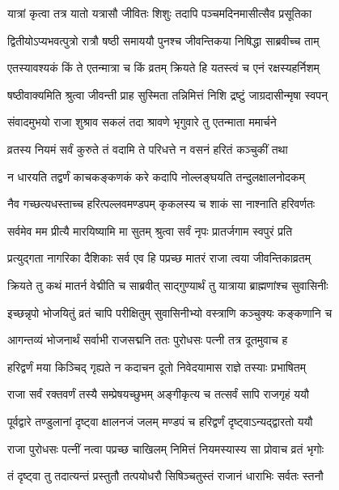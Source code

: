\twolineshloka
{यात्रां कृत्वा तत्र यातो यत्रासौ जीवितः शिशुः}
{तदापि पञ्चमदिनमासीत्सैव प्रसूतिका} %

\twolineshloka
{द्वितीयोऽप्यभवत्पुत्रो रात्रौ षष्ठी समाययौ}
{पुनश्च जीवन्तिकया निषिद्धा साब्रवीच्च ताम्} %

\twolineshloka
{एतस्यावश्यकं किं ते एतन्मात्रा च किं व्रतम्}
{क्रियते हि यतस्त्वं च एनं रक्षस्यहर्निशम्} %

\twolineshloka
{षष्ठीवाक्यमिति श्रुत्वा जीवन्ती प्राह सुस्मिता}
{तन्निमित्तं निशि द्रष्टुं जाग्रदासीन्मृषा स्वपन्} %

\twolineshloka
{संवादमुभयो राजा शुश्राव सकलं तदा}
{श्रावणे भृगुवारे तु एतन्माता ममार्चने} %

\twolineshloka
{व्रतस्य नियमं सर्वं कुरुते तं वदामि ते}
{परिधत्ते न वसनं हरितं कञ्चुकीं तथा} %

\twolineshloka
{न धारयति तद्वर्णं काचकङ्कणकं करे}
{कदापि नोल्लङ्घयति तन्दुलक्षालनोदकम्} %

\twolineshloka
{नैव गच्छत्यधस्ताच्च हरित्पल्लवमण्डपम्}
{कृकलस्य च शाकं सा नाश्नाति हरिवर्णतः} %

\twolineshloka
{सर्वमेव मम प्रीत्यै मारयिष्यामि मा सुतम्}
{श्रुत्वा सर्वं नृपः प्रातर्जगाम स्वपुरं प्रति} %

\twolineshloka
{प्रत्युद्गता नागरिका दैशिकाः सर्व एव हि}
{पप्रच्छ मातरं राजा त्वया जीवन्तिकाव्रतम्} %

\twolineshloka
{क्रियते तु कथं मातर्न वेद्मीति च साब्रवीत्}
{साद्गुण्यार्थं तु यात्राया ब्राह्मणांश्च सुवासिनीः} %

\twolineshloka
{इच्छन्नृपो भोजयितुं व्रतं चापि परीक्षितुम्}
{सुवासिनीभ्यो वस्त्राणि कञ्चुक्यः कङ्कणानि च} %

\twolineshloka
{आगन्तव्यं भोजनार्थं सर्वाभी राजसद्मनि}
{ततः पुरोधसः पत्नी तत्र दूतमुवाच ह} %

\twolineshloka
{हरिद्वर्णं मया किञ्चिद् गृह्यते न कदाचन}
{दूतो निवेदयामास राज्ञे तस्याः प्रभाषितम्} %

\twolineshloka
{राजा सर्वं रक्तवर्णं तस्यै सम्प्रेषयच्छुभम्}
{अङ्गीकृत्य च तत्सर्वं सापि राजगृहं ययौ} %

\twolineshloka
{पूर्वद्वारे तण्डुलानां दृष्ट्वा क्षालनजं जलम्}
{मण्डपं च हरिद्वर्णं दृष्ट्वाऽन्यद्द्वारतो ययौ} %

\twolineshloka
{राजा पुरोधसः पत्नीं नत्वा पप्रच्छ चाखिलम्}
{निमित्तं नियमस्यास्य सा प्रोवाच व्रतं भृगोः} %

\twolineshloka
{तं दृष्ट्वा तु तदात्यन्तं प्रस्तुतौ तत्पयोधरौ}
{सिषिञ्चतुस्तं राजानं धाराभिः सर्वतः स्तनौ} %

